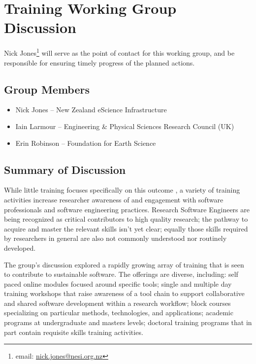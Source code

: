 \section{Training Working Group Discussion}
\label{sec:appendix_training}

Nick Jones\footnote{email:
\href{mailto:nick.jones@nesi.org.nz}{nick.jones@nesi.org.nz}} will serve as the
point of contact for this working group, and be responsible for ensuring timely
progress of the planned actions.

\subsection{Group Members}
\begin{itemize}
\item Nick Jones -- New Zealand eScience Infrastructure
\item Iain Larmour -- Engineering \& Physical Sciences Research Council (UK)
\item Erin Robinson -- Foundation for Earth Science
\end{itemize}

\subsection{Summary of Discussion}


While little training focuses specifically on this outcome , a variety of training activities increase researcher awareness of
and engagement with software professionals and software engineering practices.
Research Software Engineers are being recognized as critical contributors to
high quality research; the pathway to acquire and master the relevant skills
isn't yet clear; equally those skills required by researchers in general are
also not commonly understood nor routinely developed.

The group's discussion explored a rapidly growing array of training that is seen
to contribute to sustainable software. The offerings are diverse, including:
self paced online modules focused around specific tools; single and multiple day
training workshops that raise awareness of a tool chain to support collaborative
and shared software development within a research workflow; block courses
specializing on particular methods, technologies, and applications; academic
programs at undergraduate and masters levels; doctoral training programs that in
part contain requisite skills training activities.


